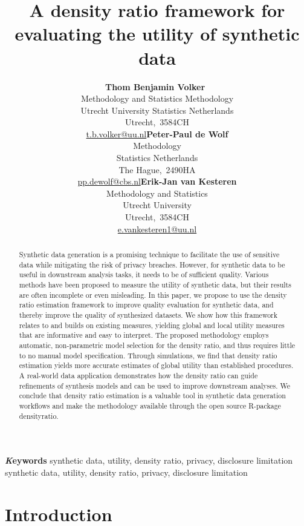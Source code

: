 \documentclass[
]{article}
\title{A density ratio framework for evaluating the utility of synthetic
data}
\author{\textbf{Thom Benjamin
Volker}~\orcidlink{0000-0002-2408-7820}\\Methodology and Statistics
\textbar{} Methodology\\Utrecht University \textbar{} Statistics
Netherlands\\Utrecht,\ 3584CH\\\href{mailto:t.b.volker@uu.nl}{t.b.volker@uu.nl}\asep\textbf{Peter-Paul
de Wolf}\\Methodology\\Statistics Netherlands\\The
Hague,\ 2490HA\\\href{mailto:pp.dewolf@cbs.nl}{pp.dewolf@cbs.nl}\asep\textbf{Erik-Jan
van Kesteren}\\Methodology and Statistics\\Utrecht
University\\Utrecht,\ 3584CH\\\href{mailto:e.vankesteren1@uu.nl}{e.vankesteren1@uu.nl}}
\date{}
\begin{document}
\maketitle
\begin{abstract}
Synthetic data generation is a promising technique to facilitate the use
of sensitive data while mitigating the risk of privacy breaches.
However, for synthetic data to be useful in downstream analysis tasks,
it needs to be of sufficient quality. Various methods have been proposed
to measure the utility of synthetic data, but their results are often
incomplete or even misleading. In this paper, we propose to use the
density ratio estimation framework to improve quality evaluation for
synthetic data, and thereby improve the quality of synthesized datasets.
We show how this framework relates to and builds on existing measures,
yielding global and local utility measures that are informative and easy
to interpret. The proposed methodology employs automatic, non-parametric
model selection for the density ratio, and thus requires little to no
manual model specification. Through simulations, we find that density
ratio estimation yields more accurate estimates of global utility than
established procedures. A real-world data application demonstrates how
the density ratio can guide refinements of synthesis models and can be
used to improve downstream analyses. We conclude that density ratio
estimation is a valuable tool in synthetic data generation workflows and
make the methodology available through the open source R-package
densityratio.
\end{abstract}
{\bfseries \emph Keywords}
\def\sep{\textbullet\ }
synthetic data, utility, density ratio, privacy, disclosure
limitation \sep 
synthetic data, utility, density ratio, privacy, disclosure limitation



\section{Introduction}\label{introduction}

\linespread{1}

\linespread{2}
\end{document}
